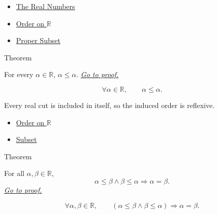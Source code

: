 \begin{dependencies}
\begin{itemize}
  \item \hyperref[def:reals]{The Real Numbers}
  \item \hyperref[def:order-on-r]{Order on $\mathbb{R}$}
  \item \hyperref[def:proper-subset]{Proper Subset}
\end{itemize}
\end{dependencies}

\begin{theorembox}{Theorem}
\begin{theorem}
\label{thm:order-on-r-reflexive}
For every $\alpha\in\mathbb{R}$, $\alpha\le\alpha$.
\hyperref[prf:order-on-r-reflexive]{\textit{Go to proof.}}
\end{theorem}
\end{theorembox}

\begin{remark*}
\[
\forall \alpha\in\mathbb{R},\qquad \alpha\le\alpha.
\]
\end{remark*}

\begin{remark*}[Interpretation]
Every real cut is included in itself, so the induced order is reflexive.
\end{remark*}

\begin{dependencies}
\begin{itemize}
  \item \hyperref[def:order-on-r]{Order on $\mathbb{R}$}
  \item \hyperref[def:subset]{Subset}
\end{itemize}
\end{dependencies}

\begin{theorembox}{Theorem}
\begin{theorem}
\label{thm:order-on-r-antisymmetric}
For all $\alpha,\beta\in\mathbb{R}$,
\[
\alpha\le\beta\land\beta\le\alpha \Longrightarrow \alpha=\beta.
\]
\hyperref[prf:order-on-r-antisymmetric]{\textit{Go to proof.}}
\end{theorem}
\end{theorembox}

\begin{remark*}
\[
\forall \alpha,\beta\in\mathbb{R},\qquad
(\alpha\le\beta\land\beta\le\alpha)\Longrightarrow \alpha=\beta.
\]
\end{remark*}


